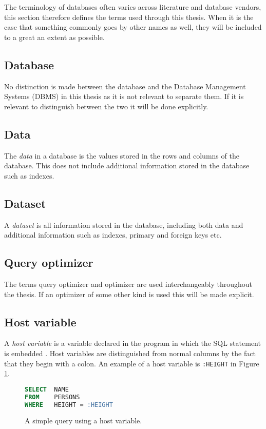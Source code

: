 The terminology of databases often varies across literature and database vendors, this section therefore defines the terms used through this thesis. When it is the case that something commonly goes by other names as well, they will be included to a great an extent as possible.

\subsection*{Database}
No distinction is made between the database and the Database Management Systems (DBMS) in this thesis as it is not relevant to separate them. If it is relevant to distinguish between the two it will be done explicitly.

\subsection*{Data}
The \textit{data} in a database is the values stored in the rows and columns of the database. This does not include additional information stored in the database such as indexes.

\subsection*{Dataset}
A \textit{dataset} is all information stored in the database, including both data and additional information such as indexes, primary and foreign keys etc.

\subsection*{Query optimizer}
The terms query optimizer and optimizer are used interchangeably throughout the thesis. If an optimizer of some other kind is used this will be made explicit.

\subsection*{Host variable}
A \textit{host variable} is a variable declared in the program in which the SQL statement is embedded \cite[p. 151]{chamberlin_1998_complete_acgtdud}. Host variables are distinguished from normal columns by the fact that they begin with a colon. An example of a host variable is \texttt{:HEIGHT} in Figure \ref{fig:sql:hostvar}.

\begin{figure}[ht]
\begin{lstlisting}[language=SQL]
SELECT  NAME
FROM    PERSONS
WHERE   HEIGHT = :HEIGHT
\end{lstlisting}
\caption[A query with a host variable]{A simple query using a host variable.}\label{fig:sql:hostvar}
\end{figure}


